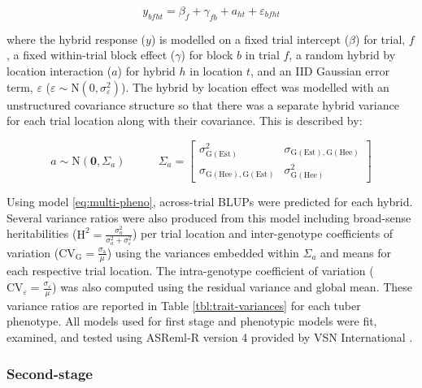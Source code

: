 \begin{equation}
y_{bfht} = \beta_f +\gamma_{fb} + a_{ht} + \varepsilon_{bfht} 
\label{eq:multi-pheno}
\end{equation}

where the hybrid response (\(y\)) is modelled on a fixed trial intercept (\(\beta\)) for trial, \(f\), a fixed within-trial block effect (\(\gamma\)) for block \(b\) in trial \(f\), a random hybrid by location interaction (\(a\)) for hybrid \(h\) in location \(t\), and an IID Gaussian error term, \(\varepsilon\) (\(\varepsilon \sim \mathrm{N} \left ( 0, \sigma_{\varepsilon}^2 \right )\)). The hybrid by location effect was modelled with an unstructured covariance structure so that there was a separate hybrid variance for each trial location along with their covariance. This is described by:

\[ a \sim \mathrm{N} \left (\mathbf{0},  \Sigma_a \right )  ~~~~~~~~~~~~~  \Sigma_a =\begin{bmatrix} \sigma^2_{\mathrm{G(Est)}} &  \sigma_{\mathrm{G(Est),G(Hee)}}\\ \sigma_{\mathrm{G(Hee),G(Est)}} & \sigma^2_{\mathrm{G(Hee)}}\end{bmatrix}  \]

Using model \eqref{eq:multi-pheno}, across-trial BLUPs were predicted for each hybrid. Several variance ratios were also produced from this model including broad-sense heritabilities (\(\mathrm H^2 = \frac{\sigma^2_{a}}{\sigma^2_{a} + \sigma^2_\varepsilon}\)) per trial location and inter-genotype coefficients of variation (\(\mathrm{CV_{G}} = \frac{\sigma_{\mathrm a}}{\mu}\)) using the variances embedded within \(\Sigma_a\) and means for each respective trial location. The intra-genotype coefficient of variation (\(\mathrm{CV}_\varepsilon = \frac{\sigma_\varepsilon}{\mu}\)) was also computed using the residual variance and global mean. These variance ratios are reported in Table \ref{tbl:trait-variances} for each tuber phenotype. All models used for first stage and phenotypic models were fit, examined, and tested using ASReml-R version 4 provided by VSN International \cite{Butler2017}.

\subsubsection{Second-stage}


